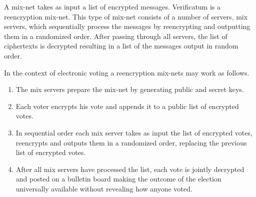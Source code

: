  A mix-net takes as input a list of encrypted messages. Verificatum is
 a reencryption mix-net. This type of mix-net consists of a number of
 servers, mix servers, which sequentially process the messages by
 reencrypting and outputting them in a randomized order. After passing
 through all servers, the list of ciphertexts is decrypted resulting
 in a list of the messages output in random order.

In the context of electronic voting a reencryption mix-nets may work
as follows.
\begin{enumerate}
\item The mix servers prepare the mix-net by generating public and
  secret keys.
\item Each voter encrypts his vote and appends it to a public list of
  encrypted votes.
\item In sequential order each mix server takes as input the list of
  encrypted votes, reencrypts and outputs them in a randomized order,
  replacing the previous list of encrypted votes.
\item After all mix servers have processed the list, each vote is
  jointly decrypted and posted on a bulletin board making the outcome
  of the election universally available without revealing how anyone
  voted.
\end{enumerate}

\begin{center}
\end{center}

